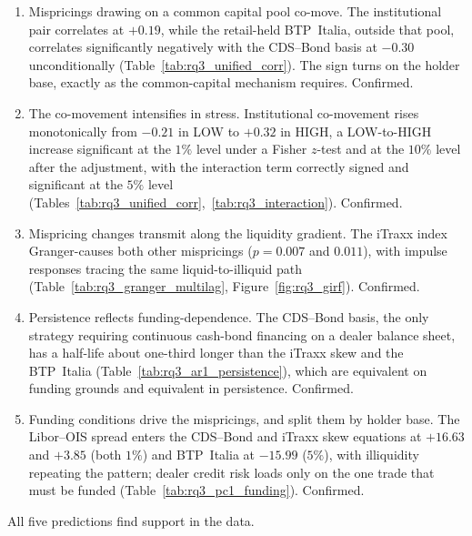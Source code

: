 \begin{enumerate}[label=\textbf{P\arabic*.}, leftmargin=*, itemsep=4pt]

\item Mispricings drawing on a common capital pool co-move. The
  institutional pair correlates at $+0.19$, while the retail-held
  BTP~Italia, outside that pool, correlates significantly negatively
  with the CDS--Bond basis at $-0.30$ unconditionally
  (Table~\ref{tab:rq3_unified_corr}). The sign turns on the holder
  base, exactly as the common-capital mechanism requires. Confirmed.

\item The co-movement intensifies in stress. Institutional co-movement
  rises monotonically from $-0.21$ in LOW to $+0.32$ in HIGH, a
  LOW-to-HIGH increase significant at the $1\%$ level under a
  Fisher $z$-test and at the $10\%$ level after the
  \citet{forbes2002no} adjustment, with the interaction term correctly
  signed and significant at the $5\%$ level
  (Tables~\ref{tab:rq3_unified_corr},~\ref{tab:rq3_interaction}).
  Confirmed.

\item Mispricing changes transmit along the liquidity gradient. The
  iTraxx index Granger-causes both other mispricings ($p=0.007$ and
  $0.011$), with impulse responses tracing the same liquid-to-illiquid
  path (Table~\ref{tab:rq3_granger_multilag},
  Figure~\ref{fig:rq3_girf}). Confirmed.

\item Persistence reflects funding-dependence. The CDS--Bond basis,
  the only strategy requiring continuous cash-bond financing on a
  dealer balance sheet, has a half-life about one-third longer than
  the iTraxx skew and the BTP~Italia
  (Table~\ref{tab:rq3_ar1_persistence}), which are equivalent on
  funding grounds and equivalent in persistence. Confirmed.

\item Funding conditions drive the mispricings, and split them by
  holder base. The Libor--OIS spread enters the CDS--Bond and iTraxx skew
  equations at $+16.63$ and $+3.85$ (both $1\%$) and BTP~Italia at
  $-15.99$ ($5\%$), with illiquidity repeating the pattern; dealer
  credit risk loads only on the one trade that must be funded
  (Table~\ref{tab:rq3_pc1_funding}). Confirmed.

\end{enumerate}

\noindent All five predictions find support in the data.